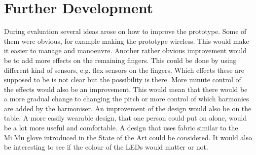 \section{Further Development}

During evaluation several ideas arose on how to improve the prototype. Some of them were obvious, for example making the prototype wireless. This would make it easier to manage and manoeuvre. 
Another rather obvious improvement would be to add more effects on the remaining fingers. This could be done by using different kind of sensors, e.g. flex sensors on the fingers.
Which effects these are supposed to be is not clear but the possibility is there.
More minute control of the effects would also be an improvement. This would mean that there would be a more gradual change to changing the pitch or more control of which harmonies are added by the harmoniser. 
An improvement of the design would also be on the table. A more easily wearable design, that one person could put on alone, would be a lot more useful and comfortable. A design that uses fabric similar to the Mi.Mu glove introduced in the State of the Art could be considered.
It would also be interesting to see if the colour of the LEDs would matter or not.